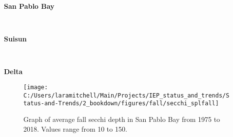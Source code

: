 \documentclass[
]{book}
\begin{document}
\begin{panel-grid}

\begin{columns-nocenter}

\begin{column800}

\textbf{San Pablo Bay}

\end{column800}

\begin{column40}

~

\end{column40}

\begin{column800}

\textbf{Suisun}

\end{column800}

\begin{column40}

~

\end{column40}

\begin{column800}

\textbf{Delta}

\end{column800}

\end{columns-nocenter}

\begin{columns-nocenter}

\begin{column800}

\begin{expand}

\begin{figure}
\texttt{[image: C:/Users/laramitchell/Main/Projects/IEP\_status\_and\_trends/Status-and-Trends/2\_bookdown/figures/fall/secchi\_splfall]} \caption{Graph of average fall secchi depth in San Pablo Bay from 1975 to 2018. Values range from 10 to 150.}\label{fig:unnamed-chunk-96}
\end{figure}

\end{expand}

\end{column800}

\begin{column40}

~


\end{column40}
\end{columns-nocenter}
\end{panel-grid}
\end{document}
